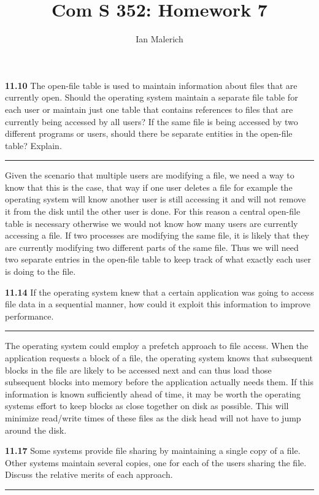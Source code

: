 \documentclass[12pt]{jhwhw}
\author{Ian Malerich}
\title{Com S 352: Homework 7}
\begin{document}
\raggedright

\textbf{11.10}  
	The open-file table is used to maintain information about files that are
	currently open. Should the operating system maintain a separate file table
	for each user or maintain just one table that contains references to files
	that are currently being accessed by all users? If the same file is being 
	accessed by two different programs or users, should there be separate 
	entities in the open-file table? Explain.
\textcolor[RGB]{240,240,240}{\rule{\textwidth}{0.5pt}}\bigbreak

	\begin{addmargin}[1em]{}
		Given the scenario that multiple users are modifying a file, we need
		a way to know that this is the case, that way if one user deletes a
		file for example the operating system will know another user is still
		accessing it and will not remove it from the disk until the other user
		is done. For this reason a central open-file table is necessary otherwise
		we would not know how many users are currently accessing a file.
		\bigbreak
		If two processes are modifying the same file, it is likely that they are
		currently modifying two different parts of the same file. Thus we will
		need two separate entries in the open-file table to keep track
		of what exactly each user is doing to the file.
	\end{addmargin}

\bigbreak
\textbf{11.14}
	If the operating system knew that a certain application was going to 
	access file data in a sequential manner, how could it exploit
	this information to improve performance.
\textcolor[RGB]{240,240,240}{\rule{\textwidth}{0.5pt}}\bigbreak

	\begin{addmargin}[1em]{}
		The operating system could employ a prefetch approach to file access.
		When the application requests a block of a file, the operating system
		knows that subsequent blocks in the file are likely to be accessed next
		and can thus load those subsequent blocks into memory before the application
		actually needs them. \bigbreak
		If this information is known sufficiently ahead of time, it may be worth
		the operating systems effort to keep blocks as close together on disk
		as possible. This will minimize read/write times of these files as the
		disk head will not have to jump around the disk.
	\end{addmargin}

\bigbreak
\textbf{11.17}  
	Some systems provide file sharing by maintaining a single copy of a file.
	Other systems maintain several copies, one for each of the users sharing
	the file. Discuss the relative merits of each approach.
\textcolor[RGB]{240,240,240}{\rule{\textwidth}{0.5pt}}\bigbreak
\end{document}
